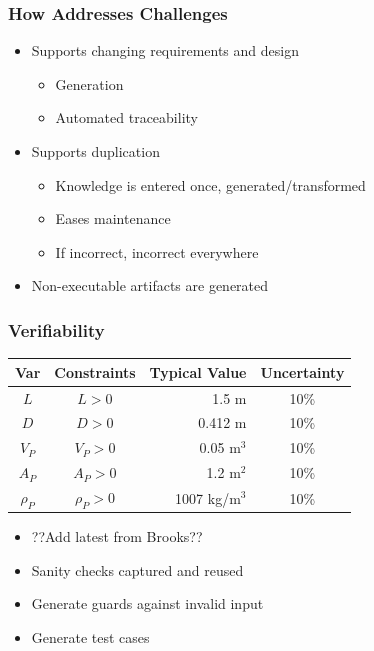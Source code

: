 \documentclass{beamer}
\begin{document}

\begin{frame}

\frametitle{How Addresses Challenges}

\begin{itemize}
\item Supports changing requirements and design
\begin{itemize}
\item Generation
\item Automated traceability
\end{itemize}
\item Supports duplication 
\begin{itemize}
\item Knowledge is entered once, generated/transformed%
\item Eases maintenance
\item If incorrect, incorrect everywhere
\end{itemize}
\item Non-executable artifacts are generated
\end{itemize}
\end{frame}


\begin{frame}

\frametitle{Verifiability}

\begin{table} 
\centering
\begin{tabular}{c c r c } 
\toprule
\textbf{Var} & \textbf{Constraints} & \textbf{Typical Value} & \textbf{Uncertainty}\\ \midrule
$L$ & $L > 0$ & 1.5 m & 10\% \\ 
$D$ & $D > 0$ & 0.412 m & 10\% \\ 
$V_P$ & $V_P > 0$ & 0.05 m$^3$	& 10\% \\
$A_P$ & $A_P > 0$ & 1.2 m$^2$	& 10\% \\
$\rho_P$ & $\rho_P > 0$	& 1007 kg/m$^3$	& 10\% \\
\bottomrule
\end{tabular}
\label{tab:pcm}
\end{table}

\begin{itemize}
\item ??Add latest from Brooks??
\item Sanity checks captured and reused
\item Generate guards against invalid input
\item Generate test cases
\end{itemize}
\end{frame}
\end{document}
